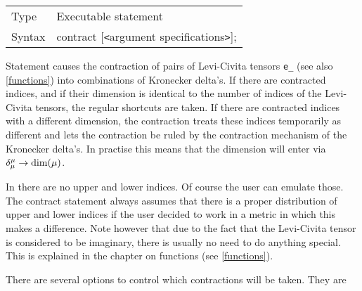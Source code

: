 \noindent \begin{tabular}{ll}
Type & Executable statement\\
Syntax & contract [{\tt<}argument specifications{\tt>}];
\end{tabular} \vspace{4mm}

\noindent Statement causes the contraction of pairs of 
Levi-Civita tensors \verb:e_: 
(see also \ref{functions}) into combinations of Kronecker 
delta's. If there are contracted indices, and if 
their dimension is identical to the number of indices of the Levi-Civita 
tensors, the regular shortcuts are taken. If there are contracted indices 
with a different dimension, the contraction treats these indices 
temporarily as different and lets the contraction be ruled by the 
contraction mechanism of the Kronecker delta's. In practise this means that 
the dimension will enter via $\delta^{\mu}_{\mu} \rightarrow {\rm 
dim}(\mu)$. \vspace{4mm}

\noindent In {\FORM} there are no upper and lower 
indices. Of course the user can 
emulate those. The contract statement always assumes that there is a proper 
distribution of upper and lower indices if the user decided to work in a 
metric in which this makes a difference. Note however that due to the fact 
that the Levi-Civita tensor is considered to be imaginary, there is usually 
no need to do anything special. This is explained in the chapter on 
functions (see \ref{functions}). \vspace{4mm}

\noindent There are several options to control which contractions will be 
taken. They are \vspace{1mm}



